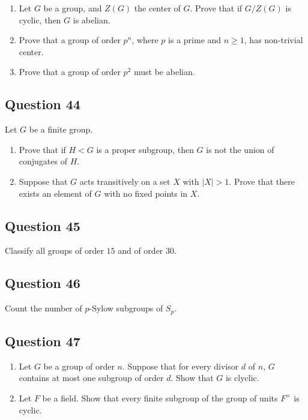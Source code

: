 \documentclass[12pt]{article}
\begin{document}
\begin{enumerate}
\def\labelenumi{\arabic{enumi}.}
\item
  Let \(G\) be a group, and \(Z(G)\) the center of \(G\). Prove that if
  \(G/Z(G)\) is cyclic, then \(G\) is abelian.
\item
  Prove that a group of order \(p^n\), where \(p\) is a prime and
  \(n \geq 1\), has non-trivial center.
\item
  Prove that a group of order \(p^2\) must be abelian.
\end{enumerate}

\hypertarget{question-44}{%
\subsection{Question 44}\label{question-44}}

Let \(G\) be a finite group.

\begin{enumerate}
\def\labelenumi{\arabic{enumi}.}
\item
  Prove that if \(H < G\) is a proper subgroup, then \(G\) is not the
  union of conjugates of \(H\).
\item
  Suppose that \(G\) acts transitively on a set \(X\) with \(|X| > 1\).
  Prove that there exists an element of \(G\) with no fixed points in
  \(X\).
\end{enumerate}

\hypertarget{question-45}{%
\subsection{Question 45}\label{question-45}}

Classify all groups of order \(15\) and of order \(30\).

\hypertarget{question-46}{%
\subsection{Question 46}\label{question-46}}

Count the number of \(p\)-Sylow subgroups of \(S_p\).

\hypertarget{question-47}{%
\subsection{Question 47}\label{question-47}}

\begin{enumerate}
\def\labelenumi{\arabic{enumi}.}
\item
  Let \(G\) be a group of order \(n\). Suppose that for every divisor
  \(d\) of \(n\), \(G\) contains at most one subgroup of order \(d\).
  Show that \(G\) is clyclic.
\item
  Let \(F\) be a field. Show that every finite subgroup of the group of
  units \(F^\times\) is cyclic.
\end{enumerate}
\end{document}
